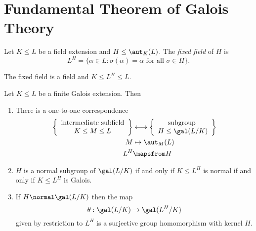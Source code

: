 \documentclass[a4paper]{article}
\begin{document}
\section{Fundamental Theorem of Galois Theory}

\begin{definition}
  Let \(K \leq L\) be a field extension and \(H \leq \aut_K(L)\). The \emph{fixed field} of \(H\) is
  \[
    L^H = \{\alpha \in L: \sigma(\alpha) = \alpha \text{ for all } \sigma \in H \}.
  \]
\end{definition}

The fixed field is a field and \(K \leq L^H \leq L\).

\begin{theorem}
  \label{thm:fundamental}
  Let \(K \leq L\) be a finite Galois extension. Then
  \begin{enumerate}
  \item There is a one-to-one correspondence
    \begin{align*}
      \left\{
        \begin{array}[h]{c}
          \text{intermediate subfield} \\
          K \leq M \leq L
        \end{array}
      \right\}
      &\longleftrightarrow
      \left\{
        \begin{array}[h]{c}
          \text{subgroup } \\
          H \leq \gal(L/K)
        \end{array}
      \right\} \\
      M &\mapsto \aut_M(L) \\
      L^H &\mapsfrom H
    \end{align*}
  \item \(H\) is a normal subgroup of \(\gal(L/K)\) if and only if \(K \leq L^H\) is normal if and only if \(K \leq L^H\) is Galois.
  \item If \(H \normal \gal(L/K)\) then the map
    \[
      \theta: \gal(L/K) \to \gal(L^H/K)
    \]
    given by restriction to \(L^H\) is a surjective group homomorphism with kernel \(H\).
  \end{enumerate}
\end{theorem}
\end{document}

